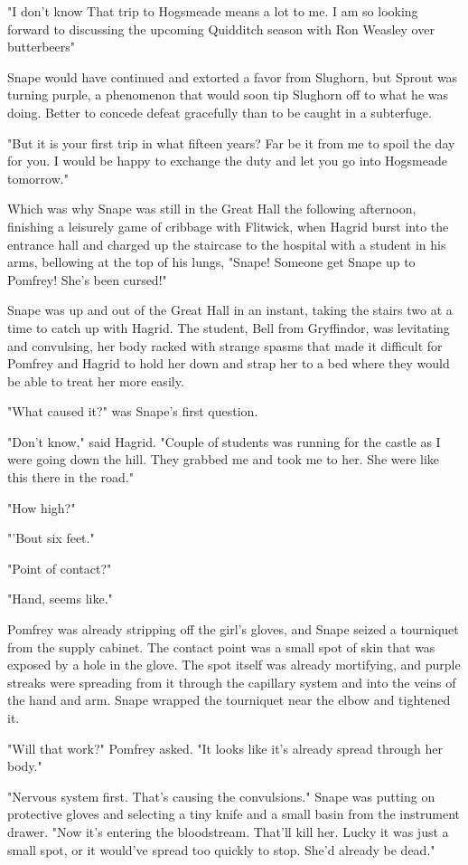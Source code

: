 "I don't know{\el} That trip to Hogsmeade means a lot to me. I am so looking forward to discussing the upcoming Quidditch season with Ron Weasley over butterbeers{\el}"

Snape would have continued and extorted a favor from Slughorn, but Sprout was turning purple, a phenomenon that would soon tip Slughorn off to what he was doing. Better to concede defeat gracefully than to be caught in a subterfuge.

"But it is your first trip in what{\el} fifteen years? Far be it from me to spoil the day for you. I would be happy to exchange the duty and let you go into Hogsmeade tomorrow."

Which was why Snape was still in the Great Hall the following afternoon, finishing a leisurely game of cribbage with Flitwick, when Hagrid burst into the entrance hall and charged up the staircase to the hospital with a student in his arms, bellowing at the top of his lungs, "Snape! Someone get Snape up to Pomfrey! She's been cursed!"

Snape was up and out of the Great Hall in an instant, taking the stairs two at a time to catch up with Hagrid. The student, Bell from Gryffindor, was levitating and convulsing, her body racked with strange spasms that made it difficult for Pomfrey and Hagrid to hold her down and strap her to a bed where they would be able to treat her more easily.

"What caused it?" was Snape's first question.

"Don't know," said Hagrid. "Couple of students was running for the castle as I were going down the hill. They grabbed me and took me to her. She were like this there in the road."

"How high?"

"'Bout six feet."

"Point of contact?"

"Hand, seems like."

Pomfrey was already stripping off the girl's gloves, and Snape seized a tourniquet from the supply cabinet. The contact point was a small spot of skin that was exposed by a hole in the glove. The spot itself was already mortifying, and purple streaks were spreading from it through the capillary system and into the veins of the hand and arm. Snape wrapped the tourniquet near the elbow and tightened it.

"Will that work?" Pomfrey asked. "It looks like it's already spread through her body."

"Nervous system first. That's causing the convulsions." Snape was putting on protective gloves and selecting a tiny knife and a small basin from the instrument drawer. "Now it's entering the bloodstream. That'll kill her. Lucky it was just a small spot, or it would've spread too quickly to stop. She'd already be dead."

